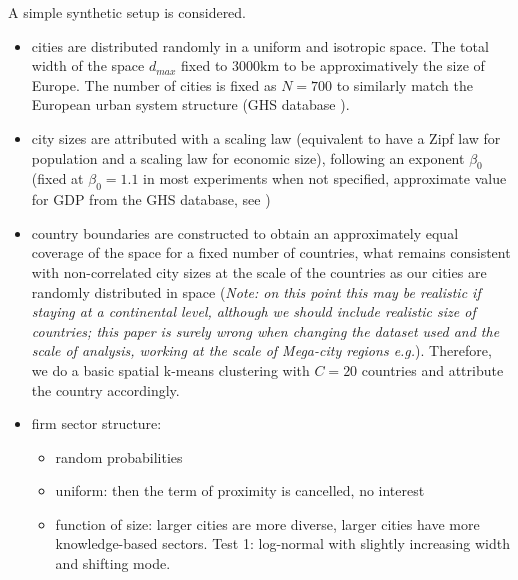 \documentclass[11pt]{article}
\begin{document}
A simple synthetic setup is considered.
\begin{itemize}
    \item cities are distributed randomly in a uniform and isotropic space. The total width of the space $d_{max}$ fixed to 3000km to be approximatively the size of Europe. The number of cities is fixed as $N=700$ to similarly match the European urban system structure (GHS database \cite{Florczyk2019ghs}).
    \item city sizes are attributed with a scaling law (equivalent to have a Zipf law for population and a scaling law for economic size), following an exponent $\beta_0$ (fixed at $\beta_0 = 1.1$ in most experiments when not specified, approximate value for GDP from the GHS database, see \cite{raimbault:halshs-02284897})
    \item country boundaries are constructed to obtain an approximately equal coverage of the space for a fixed number of countries, what remains consistent with non-correlated city sizes at the scale of the countries as our cities are randomly distributed in space \cite{simini2019testing} (\textit{Note: on this point this may be realistic if staying at a continental level, although we should include realistic size of countries; this paper is surely wrong when changing the dataset used and the scale of analysis, working at the scale of Mega-city regions e.g.}). Therefore, we do a basic spatial k-means clustering with $C = 20$ countries and attribute the country accordingly.
    \item firm sector structure: 
    \begin{itemize}
        \item random probabilities
        \item uniform: then the term of proximity is cancelled, no interest
        \item function of size: larger cities are more diverse, larger cities have more knowledge-based sectors. Test 1: log-normal with slightly increasing width and shifting mode.
    \end{itemize}
\end{itemize}
\end{document}
